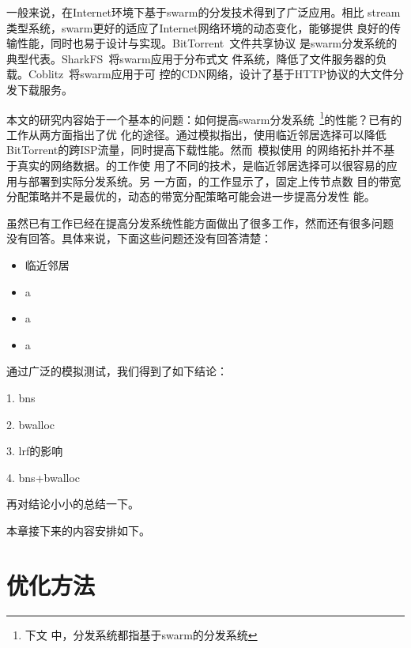 一般来说，在Internet环境下基于swarm的分发技术得到了广泛应用。相比
stream类型系统，swarm更好的适应了Internet网络环境的动态变化，能够提供
良好的传输性能，同时也易于设计与实现。BitTorrent~\cite{bt}文件共享协议
是swarm分发系统的典型代表。SharkFS~\cite{sharkfs}将swarm应用于分布式文
件系统，降低了文件服务器的负载。Coblitz~\cite{coblitz}将swarm应用于可
控的CDN网络，设计了基于HTTP协议的大文件分发下载服务。

本文的研究内容始于一个基本的问题：如何提高swarm分发系统~\footnote{下文
中，分发系统都指基于swarm的分发系统}的性能？已有的工作从两方面指出了优
化的途径。通过模拟指出，使用临近邻居选择可以降低
BitTorrent的跨ISP流量，同时提高下载性能。然而~模拟使用
的网络拓扑并不基于真实的网络数据。的工作使
用了不同的技术，是临近邻居选择可以很容易的应用与部署到实际分发系统。另
一方面，的工作显示了，固定上传节点数
目的带宽分配策略并不是最优的，动态的带宽分配策略可能会进一步提高分发性
能。


虽然已有工作已经在提高分发系统性能方面做出了很多工作，然而还有很多问题
没有回答。具体来说，下面这些问题还没有回答清楚：

\begin{itemize}
  \item 临近邻居

  \item a

  \item a

  \item a

\end{itemize}

通过广泛的模拟测试，我们得到了如下结论：

1. bns

2. bwalloc

3. lrf的影响

4. bns+bwalloc

再对结论小小的总结一下。

本章接下来的内容安排如下。


\section{优化方法}

